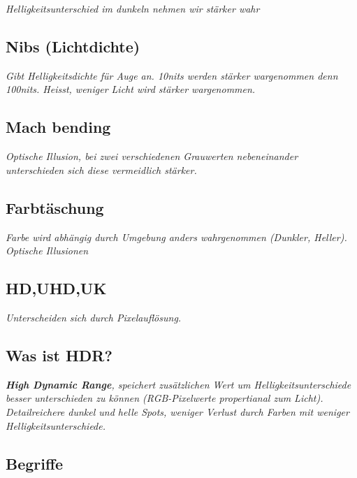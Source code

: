 \textit{Helligkeitsunterschied im dunkeln nehmen wir stärker wahr}
 
\subsection{Nibs (Lichtdichte)}

\textit{
    Gibt Helligkeitsdichte für Auge an. 10nits werden stärker wargenommen denn 100nits.
    Heisst, weniger Licht wird stärker wargenommen.
}

\subsection{Mach bending}

\textit{
    Optische Illusion, bei zwei verschiedenen Grauwerten nebeneinander
    unterschieden sich diese vermeidlich stärker.
}

\subsection{Farbtäschung}

\textit{
    Farbe wird abhängig durch Umgebung anders wahrgenommen
    (Dunkler, Heller). Optische Illusionen
}

\subsection{HD,UHD,UK}

\textit{Unterscheiden sich durch Pixelauflösung.}

\subsection{Was ist HDR?}

\textit{
    \textbf{High Dynamic Range}, speichert zusätzlichen Wert um
    Helligkeitsunterschiede besser unterschieden zu können
    (RGB-Pixelwerte propertianal zum Licht).
    Detailreichere dunkel und helle Spots, weniger Verlust
    durch Farben mit weniger Helligkeitsunterschiede.
}

\subsection{Begriffe}

